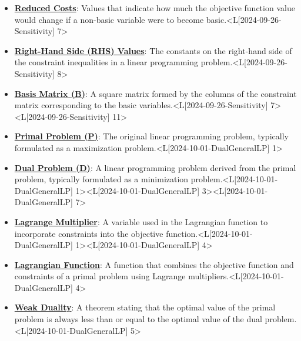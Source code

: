 \documentclass{article}%
\begin{document}
\begin{itemize}[[leftmargin=*]]
\item \href{https://www.math.purdue.edu/~yipn/421/2024-09-26-Sensitivity.pdf#page=7}{\textbf{Reduced Costs}}: Values that indicate how much the objective function value would change if a non-basic variable were to become basic.<L[2024-09-26-Sensitivity] 7>%
\item \href{https://www.math.purdue.edu/~yipn/421/2024-09-26-Sensitivity.pdf#page=8}{\textbf{Right{-}Hand Side (RHS) Values}}: The constants on the right-hand side of the constraint inequalities in a linear programming problem.<L[2024-09-26-Sensitivity] 8>%
\item \href{https://www.math.purdue.edu/~yipn/421/2024-09-26-Sensitivity.pdf#page=7}{\textbf{Basis Matrix (B)}}: A square matrix formed by the columns of the constraint matrix corresponding to the basic variables.<L[2024-09-26-Sensitivity] 7><L[2024-09-26-Sensitivity] 11>%
\end{itemize}%
\begin{itemize}[[leftmargin=*]]%
\item \href{https://www.math.purdue.edu/~yipn/421/2024-10-01-DualGeneralLP.pdf#page=1}{\textbf{Primal Problem (P)}}: The original linear programming problem, typically formulated as a maximization problem.<L[2024-10-01-DualGeneralLP] 1>%
\item \href{https://www.math.purdue.edu/~yipn/421/2024-10-01-DualGeneralLP.pdf#page=1}{\textbf{Dual Problem (D)}}: A linear programming problem derived from the primal problem, typically formulated as a minimization problem.<L[2024-10-01-DualGeneralLP] 1><L[2024-10-01-DualGeneralLP] 3><L[2024-10-01-DualGeneralLP] 7>%
\item \href{https://www.math.purdue.edu/~yipn/421/2024-10-01-DualGeneralLP.pdf#page=1}{\textbf{Lagrange Multiplier}}: A variable used in the Lagrangian function to incorporate constraints into the objective function.<L[2024-10-01-DualGeneralLP] 1><L[2024-10-01-DualGeneralLP] 4>%
\item \href{https://www.math.purdue.edu/~yipn/421/2024-10-01-DualGeneralLP.pdf#page=4}{\textbf{Lagrangian Function}}: A function that combines the objective function and constraints of a primal problem using Lagrange multipliers.<L[2024-10-01-DualGeneralLP] 4>%
\item \href{https://www.math.purdue.edu/~yipn/421/2024-10-01-DualGeneralLP.pdf#page=5}{\textbf{Weak Duality}}: A theorem stating that the optimal value of the primal problem is always less than or equal to the optimal value of the dual problem.<L[2024-10-01-DualGeneralLP] 5>%
\end{itemize}%
\end{document}
